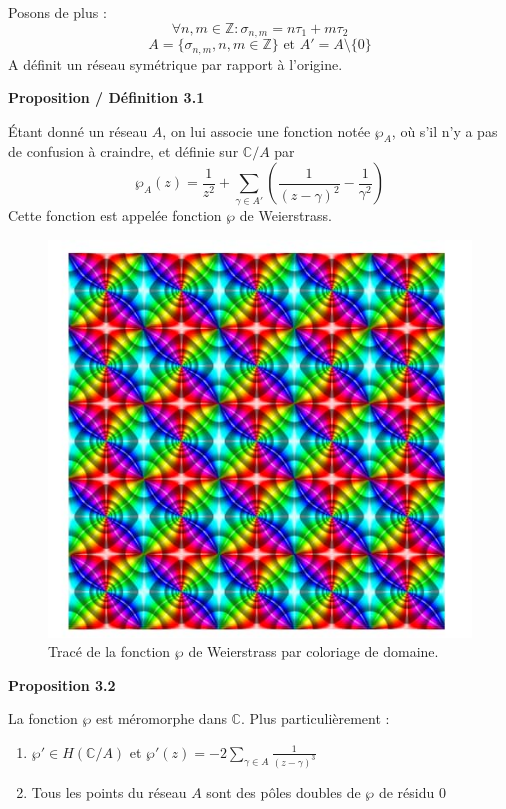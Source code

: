 \documentclass{article}
\begin{document}
Posons de plus :
\[
\forall n, m \in \mathbb{Z} : \sigma_{n, m} = n\tau_1 + m\tau_2
\]
\[
A = \{\sigma_{n, m}, n, m \in \mathbb{Z}\} \text{ et } A' = A \setminus \{0\}
\]
A définit un réseau symétrique par rapport à l'origine.

\textbf{Proposition / Définition 3.1}

Étant donné un réseau \( A \), on lui associe une fonction notée \( \wp_A \), où s'il n'y a pas de confusion à craindre, et définie sur \( \mathbb{C}/A \) par
\[
    \wp_A(z) = \frac{1}{z^2} + \sum_{\gamma \in A'} \left( \frac{1}{(z - \gamma)^2} - \frac{1}{\gamma^2} \right)
\]
Cette fonction est appelée fonction \( \wp \) de Weierstrass.

\begin{figure}
    \centering
    \includegraphics[width=\linewidth]{weierstrass_function.jpeg}
    \caption{Tracé de la fonction $\wp$ de Weierstrass par coloriage de domaine.}
\end{figure}


\textbf{Proposition 3.2}

La fonction \( \wp \) est méromorphe dans \( \mathbb{C} \). Plus particulièrement :
\begin{enumerate}
    \item \( \wp' \in H\left( \mathbb{C}/A \right)\) et \( \wp'(z) = -2 \sum_{\gamma \in A} \frac{1}{(z - \gamma)^3} \)
    \item Tous les points du réseau \( A \) sont des pôles doubles de \( \wp \) de résidu 0
\end{enumerate}
\end{document}
